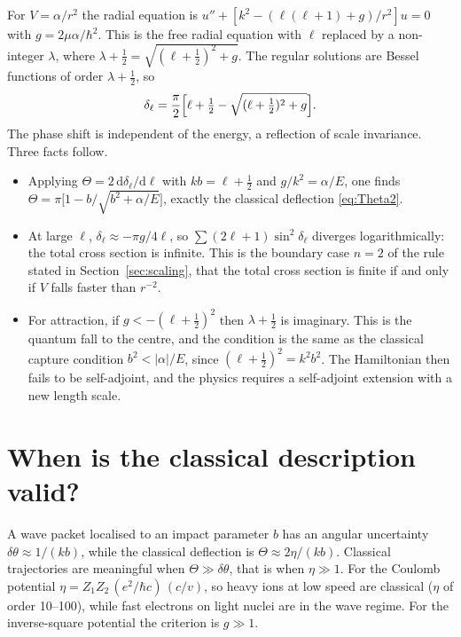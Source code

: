 \documentclass[11pt,a4paper]{book}
\numberwithin{equation}{chapter}
\newcommand{\dd}{\mathrm{d}}
\begin{document}
For $V=\alpha/r^2$ the radial equation is
$u''+[k^2-(\ell(\ell+1)+g)/r^2]u=0$ with $g=2\mu\alpha/\hbar^2$. This is the
free radial equation with $\ell$ replaced by a non-integer $\lambda$, where
$\lambda+\tfrac12=\sqrt{(\ell+\tfrac12)^2+g}$. The regular solutions are Bessel
functions of order $\lambda+\tfrac12$, so
\begin{equation}\label{eq:delta2}
  \delta_\ell=\frac\pi2\Bigl[\ell+\tfrac12-\sqrt{(\ell+\tfrac12)^2+g}\Bigr].
\end{equation}
The phase shift is independent of the energy, a reflection of scale invariance.
Three facts follow.
\begin{itemize}
  \item Applying $\Theta=2\,\dd\delta_\ell/\dd\ell$ with $kb=\ell+\tfrac12$ and
        $g/k^2=\alpha/E$, one finds
        $\Theta=\pi\bigl[1-b/\sqrt{b^2+\alpha/E}\bigr]$, exactly the classical
        deflection \eqref{eq:Theta2}.
  \item At large $\ell$, $\delta_\ell\approx-\pi g/4\ell$, so
        $\sum(2\ell+1)\sin^2\delta_\ell$ diverges logarithmically: the total
        cross section is infinite. This is the boundary case $n=2$ of the rule
        stated in Section~\ref{sec:scaling}, that the total cross section is
        finite if and only if $V$ falls faster than $r^{-2}$.
  \item For attraction, if $g<-(\ell+\tfrac12)^2$ then $\lambda+\tfrac12$ is
        imaginary. This is the quantum fall to the centre, and the condition is
        the same as the classical capture condition $b^2<|\alpha|/E$, since
        $(\ell+\tfrac12)^2=k^2b^2$. The Hamiltonian then fails to be
        self-adjoint, and the physics requires a self-adjoint extension with a
        new length scale.
\end{itemize}

\section{When is the classical description valid?}

A wave packet localised to an impact parameter $b$ has an angular uncertainty
$\delta\theta\approx1/(kb)$, while the classical deflection is
$\Theta\approx2\eta/(kb)$. Classical trajectories are meaningful when
$\Theta\gg\delta\theta$, that is when $\eta\gg1$. For the Coulomb potential
$\eta=Z_1Z_2\,(e^2/\hbar c)\,(c/v)$, so heavy ions at low speed are classical
($\eta$ of order 10--100), while fast electrons on light nuclei are in the wave
regime. For the inverse-square potential the criterion is $g\gg1$.
\end{document}
